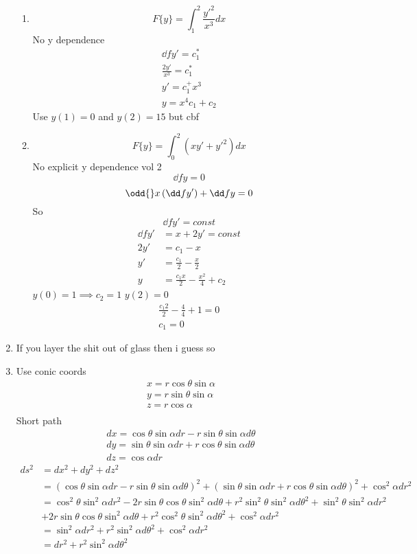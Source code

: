 \documentclass{X:/Documents/Coding/Latex/myassignment}
\begin{document}
\begin{enumerate}
\begin{enumerate}
		\item
		\[F\{y\} = \int_1^2 \frac{y'^2}{x^3} dx\] 
		No y dependence
		\begin{align*}
			\dd f{y'} = c_1^*\\
			\frac{2y'}{x^3} =c_1^*\\
			y' = c_1^+ x^3\\
			y = x^4 c_1 + c_2
		\end{align*}
		Use $y(1) = 0$ and $y(2) = 15$ but cbf
		\item
		\[F\{y\} = \int_0^2 (xy' + y'^2) dx \]
		No explicit y dependence vol 2
		\[\dd fy = 0\]
		\[\odd{}x \left(\dd f{y'}\right) + \dd fy = 0\]
		So
		\[\dd f{y'} =const \]
		\begin{align*}
			\dd f{y'} &= x + 2y' = const\\
			2y'&=c_1 -x\\
			y' &= \frac{c_1}2 -\frac{x}{2}\\
			y &= \frac{c_1 x}{2} - \frac{x^2}{4} + c_2
		\end{align*}
		$y(0) = 1 \implies c_2 =1$
		$y(2) = 0$
		\begin{align*}
			\frac{c_1 2}{2} - \frac{4}{4} +1 = 0\\
			c_1 = 0
		\end{align*}
	\end{enumerate}
	\item If you layer the shit out of glass then i guess so
	\item 
	Use conic coords
	\begin{align*}
		x = r\cos \theta \sin \alpha\\
		y = r\sin \theta \sin \alpha\\
		z = r\cos \alpha\\
	\end{align*}
	Short path
	\begin{align*}
	 	dx = \cos\theta \sin \alpha dr - r\sin\theta \sin \alpha d\theta\\
	 	dy = \sin\theta \sin \alpha dr + r\cos\theta \sin \alpha d\theta\\
	 	dz = \cos\alpha dr
	\end{align*} 
	\begin{align*}
		ds^2 &= dx^2 + dy^2 + dz^2\\
		&= \left(\cos\theta \sin \alpha dr - r\sin\theta \sin \alpha d\theta\right)^2 + \left(\sin\theta \sin \alpha dr + r\cos\theta \sin \alpha d\theta\right)^2 + \cos^2\alpha dr^2\\
		&= \cos^2 \theta \sin^2 \alpha dr^2 - 2r\sin\theta\cos\theta \sin^2 \alpha d\theta + r^2 \sin^2\theta \sin^2 \alpha d\theta^2 + \sin^2\theta \sin^2\alpha dr^2 \\&+ 2r \sin\theta\cos\theta\sin^2 \alpha d\theta + r^2\cos^2\theta \sin^2 \alpha d\theta^2 + \cos^2 \alpha dr^2\\
		&= \sin^2\alpha dr^2 + r^2 \sin^2\alpha d\theta^2 + \cos^2 \alpha dr^2\\
		&= dr^2 + r^2 \sin^2\alpha d\theta^2
	\end{align*}


\end{enumerate}
\end{document}

